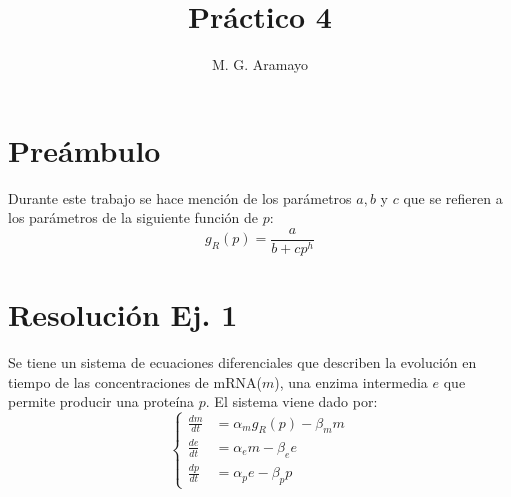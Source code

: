 \documentclass[twocolumn,aps,prl]{revtex4-1}
\begin{document}

\title{Práctico 4}
\author{M. G. Aramayo}


\maketitle



\section{Preámbulo}

Durante este trabajo se hace mención de los parámetros $a, b$ y $c$ que se refieren a los parámetros de la siguiente función de $p$:
\begin{equation}\label{eq:gr}
    g_{R}(p) = \frac{a}{b + c p^{h}}
\end{equation}

\section{Resolución Ej. 1}

Se tiene un sistema de ecuaciones diferenciales que describen la evolución en tiempo de las concentraciones de mRNA($m$), una enzima intermedia $e$ que permite producir una proteína $p$. El sistema viene dado por:
\begin{equation}\label{eq:ecuaciones}
  \left\lbrace 
  \begin{aligned}
    \frac{d m}{d t} &= \alpha_{m} g_{R}(p)-\beta_{m} m \\
    \frac{d e}{d t} &= \alpha_{e} m-\beta_{e} e \\
    \frac{d p}{d t} &= \alpha_{p} e-\beta_{p} p
  \end{aligned}\right.
\end{equation}
\end{document}
